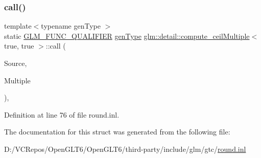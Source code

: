 \subsubsection{\texorpdfstring{call()}{call()}}
{\footnotesize\ttfamily template$<$typename gen\+Type $>$ \\
static \mbox{\hyperlink{setup_8hpp_a33fdea6f91c5f834105f7415e2a64407}{G\+L\+M\+\_\+\+F\+U\+N\+C\+\_\+\+Q\+U\+A\+L\+I\+F\+I\+ER}} \mbox{\hyperlink{structglm_1_1detail_1_1gen_type}{gen\+Type}} \mbox{\hyperlink{structglm_1_1detail_1_1compute__ceil_multiple}{glm\+::detail\+::compute\+\_\+ceil\+Multiple}}$<$ true, true $>$\+::call (\begin{DoxyParamCaption}\item[{\mbox{\hyperlink{structglm_1_1detail_1_1gen_type}{gen\+Type}}}]{Source,  }\item[{\mbox{\hyperlink{structglm_1_1detail_1_1gen_type}{gen\+Type}}}]{Multiple }\end{DoxyParamCaption})\hspace{0.3cm}{\ttfamily [inline]}, {\ttfamily [static]}}



Definition at line 76 of file round.\+inl.



The documentation for this struct was generated from the following file\+:\begin{DoxyCompactItemize}
\item 
D\+:/\+V\+C\+Repos/\+Open\+G\+L\+T6/\+Open\+G\+L\+T6/third-\/party/include/glm/gtc/\mbox{\hyperlink{round_8inl}{round.\+inl}}\end{DoxyCompactItemize}
